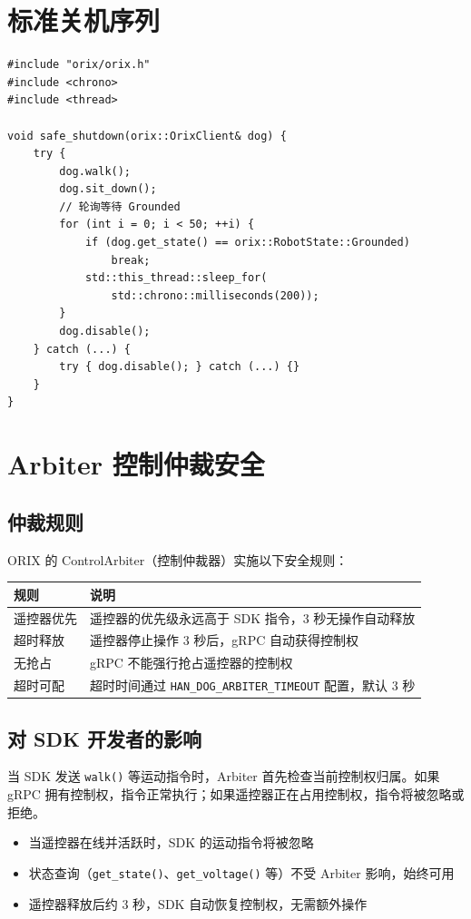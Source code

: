 \documentclass[a4paper,11pt,openany]{book}
\begin{document}
\section{标准关机序列}

\begin{lstlisting}[style=cpp]
#include "orix/orix.h"
#include <chrono>
#include <thread>

void safe_shutdown(orix::OrixClient& dog) {
    try {
        dog.walk();
        dog.sit_down();
        // 轮询等待 Grounded
        for (int i = 0; i < 50; ++i) {
            if (dog.get_state() == orix::RobotState::Grounded)
                break;
            std::this_thread::sleep_for(
                std::chrono::milliseconds(200));
        }
        dog.disable();
    } catch (...) {
        try { dog.disable(); } catch (...) {}
    }
}
\end{lstlisting}

\section{Arbiter 控制仲裁安全}

\subsection{仲裁规则}

ORIX 的 ControlArbiter（控制仲裁器）实施以下安全规则：

\begin{longtable}{ll}
\toprule
规则 & 说明 \\
\midrule
\endhead
遥控器优先 & 遥控器的优先级永远高于 SDK 指令，3 秒无操作自动释放 \\
超时释放 & 遥控器停止操作 3 秒后，gRPC 自动获得控制权 \\
无抢占 & gRPC 不能强行抢占遥控器的控制权 \\
超时可配 & 超时时间通过 \texttt{HAN\_DOG\_ARBITER\_TIMEOUT} 配置，默认 3 秒 \\
\bottomrule
\end{longtable}

\subsection{对 SDK 开发者的影响}

当 SDK 发送 \texttt{walk()} 等运动指令时，Arbiter 首先检查当前控制权归属。如果 gRPC 拥有控制权，指令正常执行；如果遥控器正在占用控制权，指令将被忽略或拒绝。

\begin{itemize}[nosep]
  \item 当遥控器在线并活跃时，SDK 的运动指令将被忽略
  \item 状态查询（\texttt{get\_state()}、\texttt{get\_voltage()} 等）不受 Arbiter 影响，始终可用
  \item 遥控器释放后约 3 秒，SDK 自动恢复控制权，无需额外操作
\end{itemize}
\end{document}
